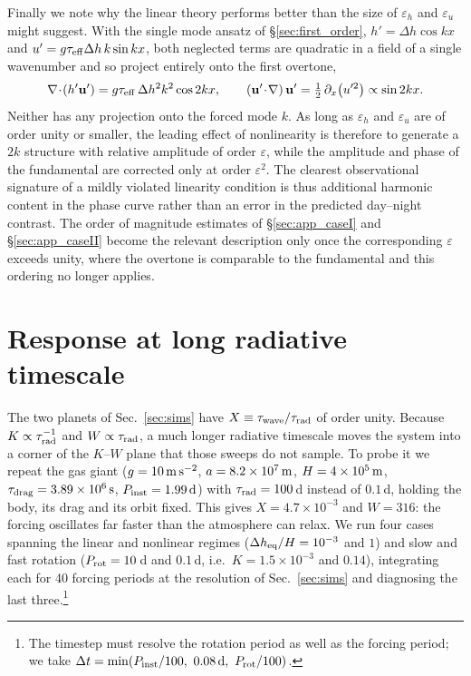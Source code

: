 \documentclass[trackchanges,twocolumn]{aastex7}
\begin{document}
Finally we note why the linear theory performs better than the size of $\varepsilon_h$ and
$\varepsilon_u$ might suggest. With the single mode ansatz of \S\ref{sec:first_order},
$h' = \Delta h\cos kx$ and $u' = g\tau_{\rm eff}\Delta h\,k \sin kx$, both neglected terms are
quadratic in a field of a single wavenumber and so project entirely onto the first overtone,
\begin{equation}
    \nabla\!\cdot\!\left(h'\mathbf{u}'\right) = g\tau_{\rm eff}\,\Delta h^{2} k^{2}\cos 2kx,
    \qquad
    \left(\mathbf{u}'\!\cdot\!\nabla\right)\mathbf{u}'
    = \tfrac{1}{2}\,\partial_x\!\left(u'^{2}\right) \propto \sin 2kx .
    \label{eq:app_harmonic}
\end{equation}
Neither has any projection onto the forced mode $k$. As long as $\varepsilon_h$ and
$\varepsilon_u$ are of order unity or smaller, the leading effect of nonlinearity is therefore
to generate a $2k$ structure with relative amplitude of order $\varepsilon$, while the
amplitude and phase of the fundamental are corrected only at order $\varepsilon^{2}$. The
clearest observational signature of a mildly violated linearity condition is thus additional
harmonic content in the phase curve rather than an error in the predicted day--night contrast.
The order of magnitude estimates of \S\ref{sec:app_caseI} and \S\ref{sec:app_caseII} become the
relevant description only once the corresponding $\varepsilon$ exceeds unity, where the
overtone is comparable to the fundamental and this ordering no longer applies.


\section{Response at long radiative timescale}
\label{app:long-taurad}

The two planets of Sec.~\ref{sec:sims} have $X \equiv \tau_{\rm wave}/\tau_{\rm rad}$
of order unity. Because $K \propto \tau_{\rm rad}^{-1}$ and $W \propto \tau_{\rm rad}$,
a much longer radiative timescale moves the system into a corner of the $K$--$W$
plane that those sweeps do not sample. To probe it we repeat the gas giant
($g = 10\,{\rm m\,s^{-2}}$, $a = 8.2\times10^{7}\,{\rm m}$, $H = 4\times10^{5}\,{\rm m}$,
$\tau_{\rm drag} = 3.89\times10^{6}\,{\rm s}$, $P_{\rm inst} = 1.99\,{\rm d}$)
with $\tau_{\rm rad} = 100\,$d instead of $0.1\,$d, holding the body, its drag and
its orbit fixed. This gives $X = 4.7\times10^{-3}$ and $W = 316$: the forcing
oscillates far faster than the atmosphere can relax. We run four cases spanning
the linear and nonlinear regimes ($\Delta h_{\rm eq}/H = 10^{-3}$ and $1$) and slow
and fast rotation ($P_{\rm rot} = 10\,$d and $0.1\,$d, i.e.\ $K = 1.5\times10^{-3}$
and $0.14$), integrating each for 40 forcing periods at the resolution of
Sec.~\ref{sec:sims} and diagnosing the last three.\footnote{The timestep must
resolve the rotation period as well as the forcing period; we take
$\Delta t = \min(P_{\rm inst}/100,\ 0.08\,{\rm d},\ P_{\rm rot}/100)$.}
\end{document}
